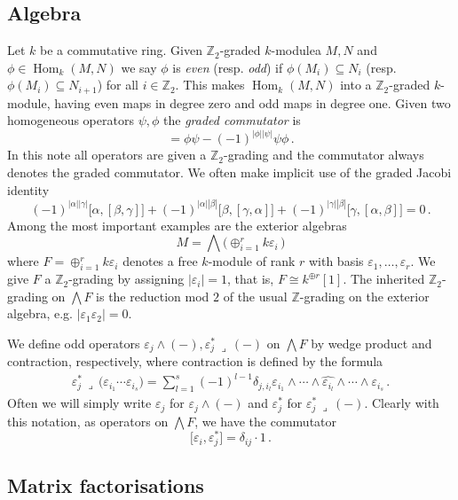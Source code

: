\documentclass[english,letter paper,12pt,leqno]{article}
\theoremstyle{example}
\numberwithin{equation}{section}
\def\Hom{\operatorname{Hom}}
\def\be{\begin{equation}}
\def\ee{\end{equation}}
\def\nZ{\mathds{Z}}
\begin{document}
\subsection{Algebra}

Let $k$ be a commutative ring. Given $\nZ_2$-graded $k$-modulea $M, N$ and $\phi \in \Hom_k(M,N)$ we say $\phi$ is \emph{even} (resp. \emph{odd}) if $\phi(M_i) \subseteq N_i$ (resp. $\phi(M_i) \subseteq N_{i+1}$) for all $i \in \nZ_2$. This makes $\Hom_k(M,N)$ into a $\nZ_2$-graded $k$-module, having even maps in degree zero and odd maps in degree one. Given two homogeneous operators $\psi, \phi$ the \emph{graded commutator} is
\be
[\phi, \psi] = \phi \psi - (-1)^{|\phi||\psi|} \psi \phi\,.
\ee
In this note all operators are given a $\nZ_2$-grading and the commutator always denotes the graded commutator. We often make implicit use of the graded Jacobi identity
\be\label{eq:graded_jacobi}
(-1)^{|\alpha||\gamma|}\big[ \alpha, [\beta, \gamma]\big] + (-1)^{|\alpha||\beta|}\big[ \beta, [\gamma, \alpha] \big] + (-1)^{|\gamma||\beta|} \big[ \gamma, [\alpha, \beta] \big] = 0\,.
\ee
Among the most important examples are the exterior algebras
\[
M = \bigwedge\big( \oplus_{i=1}^r k \varepsilon_i \,\big)
\]
where $F = \oplus_{i=1}^r k \varepsilon_i$ denotes a free $k$-module of rank $r$ with basis $\varepsilon_1,\ldots,\varepsilon_r$. We give $F$ a $\nZ_2$-grading by assigning $|\varepsilon_i| = 1$, that is, $F \cong k^{\oplus r}[1]$. The inherited $\nZ_2$-grading on $\bigwedge F$ is the reduction mod $2$ of the usual $\nZ$-grading on the exterior algebra, e.g. $|\varepsilon_1 \varepsilon_2| = 0$.

We define odd operators $\varepsilon_j \wedge (-), \varepsilon_j^* \,\lrcorner\, (-)$ on $\bigwedge F$ by wedge product and contraction, respectively, where contraction is defined by the formula
\begin{align*}
\varepsilon_j^* \,\lrcorner\, \Big( \varepsilon_{i_1} \cdots \varepsilon_{i_s} \Big) = \sum_{l=1}^s (-1)^{l-1} \delta_{j, i_l} \varepsilon_{i_1} \wedge \cdots \wedge \widehat{ \varepsilon_{i_l} } \wedge \cdots \wedge \varepsilon_{i_s}\,.
\end{align*}
Often we will simply write $\varepsilon_j$ for $\varepsilon_j \wedge (-)$ and $\varepsilon_j^*$ for $\varepsilon_j^* \,\lrcorner\, (-)$. Clearly with this notation, as operators on $\bigwedge F$, we have the commutator
\be\label{eq:wedge_contract_comm}
\big[ \varepsilon_i, \varepsilon_j^* \big] = \delta_{ij} \cdot 1\,.
\ee

\subsection{Matrix factorisations}
\end{document}
